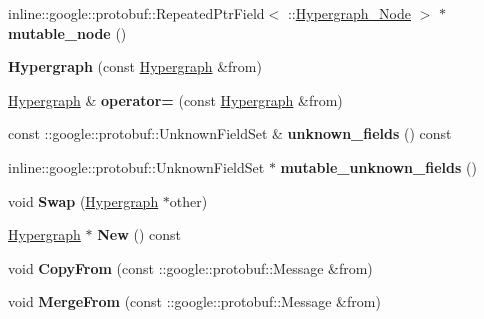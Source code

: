 \begin{DoxyCompactItemize}
\item 
\hypertarget{classHypergraph_a837f81cd9e9f3e5832e166ba2520b445}{
inline::google::protobuf::RepeatedPtrField$<$ ::\hyperlink{classHypergraph__Node}{Hypergraph\_\-Node} $>$ $\ast$ {\bfseries mutable\_\-node} ()}
\label{classHypergraph_a837f81cd9e9f3e5832e166ba2520b445}

\item 
\hypertarget{classHypergraph_aa5b69fea3073cbbc6230c403aba60a13}{
{\bfseries Hypergraph} (const \hyperlink{classHypergraph}{Hypergraph} \&from)}
\label{classHypergraph_aa5b69fea3073cbbc6230c403aba60a13}

\item 
\hypertarget{classHypergraph_a6fa4366f554df3ffd7aa3694a3612006}{
\hyperlink{classHypergraph}{Hypergraph} \& {\bfseries operator=} (const \hyperlink{classHypergraph}{Hypergraph} \&from)}
\label{classHypergraph_a6fa4366f554df3ffd7aa3694a3612006}

\item 
\hypertarget{classHypergraph_a20ec2be2fda0e1db366f26c95817cd89}{
const ::google::protobuf::UnknownFieldSet \& {\bfseries unknown\_\-fields} () const }
\label{classHypergraph_a20ec2be2fda0e1db366f26c95817cd89}

\item 
\hypertarget{classHypergraph_a423987a46404cd3221a5c4035050b4b8}{
inline::google::protobuf::UnknownFieldSet $\ast$ {\bfseries mutable\_\-unknown\_\-fields} ()}
\label{classHypergraph_a423987a46404cd3221a5c4035050b4b8}

\item 
\hypertarget{classHypergraph_ac4a85460aabebe97e0411a30d80f720d}{
void {\bfseries Swap} (\hyperlink{classHypergraph}{Hypergraph} $\ast$other)}
\label{classHypergraph_ac4a85460aabebe97e0411a30d80f720d}

\item 
\hypertarget{classHypergraph_a9b21d571070e88fe8ed3f6751e495b04}{
\hyperlink{classHypergraph}{Hypergraph} $\ast$ {\bfseries New} () const }
\label{classHypergraph_a9b21d571070e88fe8ed3f6751e495b04}

\item 
\hypertarget{classHypergraph_a344289a1a02daaa7e9bb2284507bc25b}{
void {\bfseries CopyFrom} (const ::google::protobuf::Message \&from)}
\label{classHypergraph_a344289a1a02daaa7e9bb2284507bc25b}

\item 
\hypertarget{classHypergraph_a4aafea60a0bf75fe2c2f66172101110b}{
void {\bfseries MergeFrom} (const ::google::protobuf::Message \&from)}
\label{classHypergraph_a4aafea60a0bf75fe2c2f66172101110b}


\end{DoxyCompactItemize}
